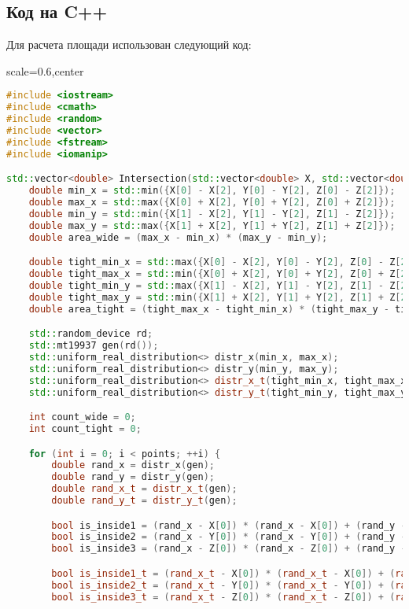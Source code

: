 \documentclass{article}
\begin{document}
\subsection{Код на C++}
Для расчета площади использован следующий код:
\\
\begin{adjustbox}{scale=0.6,center}
\begin{lstlisting}[language=C++]
#include <iostream>
#include <cmath>
#include <random>
#include <vector>
#include <fstream>
#include <iomanip>

std::vector<double> Intersection(std::vector<double> X, std::vector<double> Y, std::vector<double> Z, int points) {
    double min_x = std::min({X[0] - X[2], Y[0] - Y[2], Z[0] - Z[2]});
    double max_x = std::max({X[0] + X[2], Y[0] + Y[2], Z[0] + Z[2]});
    double min_y = std::min({X[1] - X[2], Y[1] - Y[2], Z[1] - Z[2]});
    double max_y = std::max({X[1] + X[2], Y[1] + Y[2], Z[1] + Z[2]});
    double area_wide = (max_x - min_x) * (max_y - min_y);

    double tight_min_x = std::max({X[0] - X[2], Y[0] - Y[2], Z[0] - Z[2]});
    double tight_max_x = std::min({X[0] + X[2], Y[0] + Y[2], Z[0] + Z[2]});
    double tight_min_y = std::max({X[1] - X[2], Y[1] - Y[2], Z[1] - Z[2]});
    double tight_max_y = std::min({X[1] + X[2], Y[1] + Y[2], Z[1] + Z[2]});
    double area_tight = (tight_max_x - tight_min_x) * (tight_max_y - tight_min_y);

    std::random_device rd;
    std::mt19937 gen(rd());
    std::uniform_real_distribution<> distr_x(min_x, max_x);
    std::uniform_real_distribution<> distr_y(min_y, max_y);
    std::uniform_real_distribution<> distr_x_t(tight_min_x, tight_max_x);
    std::uniform_real_distribution<> distr_y_t(tight_min_y, tight_max_y);

    int count_wide = 0;
    int count_tight = 0;

    for (int i = 0; i < points; ++i) {
        double rand_x = distr_x(gen);
        double rand_y = distr_y(gen);
        double rand_x_t = distr_x_t(gen);
        double rand_y_t = distr_y_t(gen);

        bool is_inside1 = (rand_x - X[0]) * (rand_x - X[0]) + (rand_y - X[1]) * (rand_y - X[1]) <= X[2] * X[2];
        bool is_inside2 = (rand_x - Y[0]) * (rand_x - Y[0]) + (rand_y - Y[1]) * (rand_y - Y[1]) <= Y[2] * Y[2];
        bool is_inside3 = (rand_x - Z[0]) * (rand_x - Z[0]) + (rand_y - Z[1]) * (rand_y - Z[1]) <= Z[2] * Z[2];

        bool is_inside1_t = (rand_x_t - X[0]) * (rand_x_t - X[0]) + (rand_y_t - X[1]) * (rand_y_t - X[1]) <= X[2] * X[2];
        bool is_inside2_t = (rand_x_t - Y[0]) * (rand_x_t - Y[0]) + (rand_y_t - Y[1]) * (rand_y_t - Y[1]) <= Y[2] * Y[2];
        bool is_inside3_t = (rand_x_t - Z[0]) * (rand_x_t - Z[0]) + (rand_y_t - Z[1]) * (rand_y_t - Z[1]) <= Z[2] * Z[2];


\end{lstlisting}
\end{adjustbox}
\end{document}
